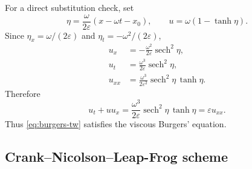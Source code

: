 \documentclass[11pt]{article}
\begin{document}
For a direct substitution check, set
\begin{equation}
    \eta=\frac{\omega}{2\varepsilon}(x-\omega t-x_0),
    \qquad
    u=\omega(1-\tanh\eta).
\end{equation}
Since $\eta_x=\omega/(2\varepsilon)$ and $\eta_t=-\omega^2/(2\varepsilon)$,
\begin{align}
    u_x&=-\frac{\omega^2}{2\varepsilon}\operatorname{sech}^2\eta,\\
    u_t&=\frac{\omega^3}{2\varepsilon}\operatorname{sech}^2\eta,\\
    u_{xx}&=\frac{\omega^3}{2\varepsilon^2}\operatorname{sech}^2\eta\,\tanh\eta.
\end{align}
Therefore
\begin{equation}
    u_t+u u_x
    =
    \frac{\omega^3}{2\varepsilon}
    \operatorname{sech}^2\eta\,\tanh\eta
    =
    \varepsilon u_{xx}.
\end{equation}
Thus \eqref{eq:burgers-tw} satisfies the viscous Burgers' equation.

\subsection{Crank--Nicolson--Leap-Frog scheme}
\end{document}
